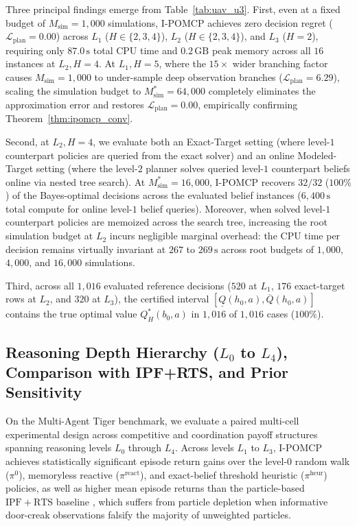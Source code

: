 Three principal findings emerge from Table~\ref{tab:uav_u3}. First, even at a fixed budget of $M_{\text{sim}}=1{,}000$ simulations, I-POMCP achieves zero decision regret ($\mathcal{L}_{\mathrm{plan}} = 0.00$) across $L_1$ ($H \in \{2,3,4\}$), $L_2$ ($H \in \{2,3,4\}$), and $L_3$ ($H=2$), requiring only $87.0\,\text{s}$ total CPU time and $0.2\,\text{GB}$ peak memory across all $16$ instances at $L_2, H=4$. At $L_1, H=5$, where the $15\times$ wider branching factor causes $M_{\text{sim}}=1{,}000$ to under-sample deep observation branches ($\mathcal{L}_{\mathrm{plan}} = 6.29$), scaling the simulation budget to $M_{\text{sim}}^* = 64{,}000$ completely eliminates the approximation error and restores $\mathcal{L}_{\mathrm{plan}} = 0.00$, empirically confirming Theorem~\ref{thm:ipomcp_conv}.

Second, at $L_2, H=4$, we evaluate both an Exact-Target setting (where level-$1$ counterpart policies are queried from the exact solver) and an online Modeled-Target setting (where the level-$2$ planner solves queried level-$1$ counterpart beliefs online via nested tree search). At $M_{\text{sim}}^* = 16{,}000$, I-POMCP recovers $32/32$ ($100\%$) of the Bayes-optimal decisions across the evaluated belief instances ($6{,}400\,\text{s}$ total compute for online level-$1$ belief queries). Moreover, when solved level-$1$ counterpart policies are memoized across the search tree, increasing the root simulation budget at $L_2$ incurs negligible marginal overhead: the CPU time per decision remains virtually invariant at $267$ to $269\,\text{s}$ across root budgets of $1{,}000$, $4{,}000$, and $16{,}000$ simulations.

Third, across all $1{,}016$ evaluated reference decisions ($520$ at $L_1$, $176$ exact-target rows at $L_2$, and $320$ at $L_3$), the certified interval $[\underline{Q}(h_0, a), \overline{Q}(h_0, a)]$ contains the true optimal value $Q_H^*(b_0, a)$ in $1{,}016$ of $1{,}016$ cases ($100\%$).

\subsection{Reasoning Depth Hierarchy (\texorpdfstring{$L_0$}{L0} to \texorpdfstring{$L_4$}{L4}), Comparison with IPF+RTS, and Prior Sensitivity}

On the Multi-Agent Tiger benchmark, we evaluate a paired multi-cell experimental design across competitive and coordination payoff structures spanning reasoning levels $L_0$ through $L_4$. Across levels $L_1$ to $L_3$, I-POMCP achieves statistically significant episode return gains over the level-$0$ random walk ($\pi^0$), memoryless reactive ($\pi^{\mathrm{react}}$), and exact-belief threshold heuristic ($\pi^{\mathrm{heur}}$) policies, as well as higher mean episode returns than the particle-based $\mathrm{IPF+RTS}$ baseline \citep{doshi2009monte}, which suffers from particle depletion when informative door-creak observations falsify the majority of unweighted particles.

